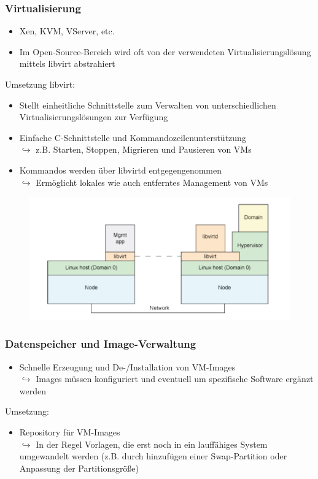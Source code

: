 \documentclass[a4paper,10pt]{scrreprt}
\begin{document}
	\subsubsection{Virtualisierung}
	\begin{itemize}
		\item Xen, KVM, VServer, etc.
		\item Im Open-Source-Bereich wird oft von der verwendeten Virtualisierungslösung mittels libvirt abstrahiert
	\end{itemize}
	Umsetzung libvirt:
	\begin{itemize}
		\item Stellt einheitliche Schnittstelle zum Verwalten von unterschiedlichen Virtualisierungslösungen zur Verfügung
		\item Einfache C-Schnittstelle und Kommandozeilenunterstützung\\[5pt]
		$\hookrightarrow$ z.B. Starten, Stoppen, Migrieren und Pausieren von VMs
		\item Kommandos werden über libvirtd entgegengenommen\\[5pt]
		$\hookrightarrow$ Ermöglicht lokales wie auch entferntes Management von VMs
	\end{itemize}
	\begin{figure}[ht]
		\centering
		\includegraphics[width=.9\textwidth]{images/libvirt}
	\end{figure}
	\subsubsection{Datenspeicher und Image-Verwaltung}
	\begin{itemize}
		\item Schnelle Erzeugung und De-/Installation von VM-Images\\[5pt]
		$\hookrightarrow$ Images müssen konfiguriert und eventuell um spezifische Software ergänzt \hspace*{12pt} werden
	\end{itemize}
	Umsetzung:
	\begin{itemize}
		\item Repository für VM-Images\\[5pt]
		$\hookrightarrow$ In der Regel Vorlagen, die erst noch in ein lauffähiges System umgewandelt \hspace*{12pt} werden (z.B. durch hinzufügen einer Swap-Partition oder Anpassung der \hspace*{12pt} Partitionsgröße)
	\end{itemize}
\end{document}
